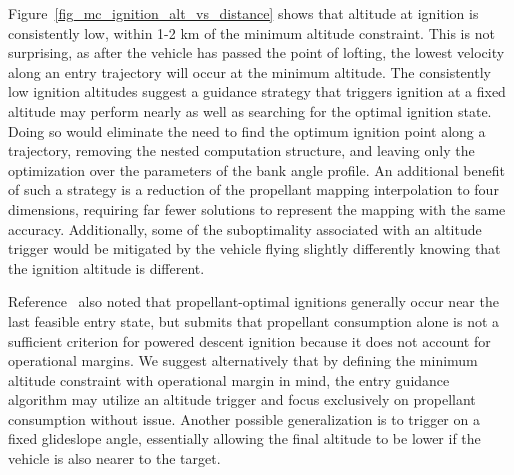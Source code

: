 Figure~\ref{fig_mc_ignition_alt_vs_distance} shows that altitude at ignition is consistently low, within 1-2 km of the minimum altitude constraint. This is not surprising, as after the vehicle has passed the point of lofting, the lowest velocity along an entry trajectory will occur at the minimum altitude.
The consistently low ignition altitudes suggest a guidance strategy that triggers ignition at a fixed altitude may perform nearly as well as searching for the optimal ignition state. Doing so would eliminate the need to find the optimum ignition point along a trajectory, removing the nested computation structure, and leaving only the optimization over the parameters of the bank angle profile. An additional benefit of such a strategy is a reduction of the propellant mapping interpolation to four dimensions, requiring far fewer solutions to represent the mapping with the same accuracy. Additionally, some of the suboptimality associated with an altitude trigger would be mitigated by the vehicle flying slightly differently knowing that the ignition altitude is different. 

Reference~\cite{PropellantOptimalAdaptiveTrigger} also noted that propellant-optimal ignitions generally occur near the last feasible entry state, but submits that propellant consumption alone is not a sufficient criterion for powered descent ignition because it does not account for operational margins. We suggest alternatively that by defining the minimum altitude constraint with operational margin in mind, the entry guidance algorithm may utilize an altitude trigger and focus exclusively on propellant consumption without issue. Another possible generalization is to trigger on a fixed glideslope angle, essentially allowing the final altitude to be lower if the vehicle is also nearer to the target.

